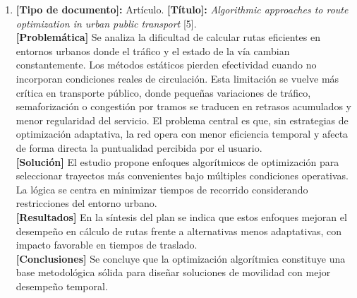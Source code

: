 \begin{enumerate}
    \item \textbf{[Tipo de documento]:} Artículo. \textbf{[Título]:} \textit{Algorithmic approaches to route optimization in urban public transport} [5].\\
    \textbf{[Problemática]} Se analiza la dificultad de calcular rutas eficientes en entornos urbanos donde el tr\'{a}fico y el estado de la v\'{i}a cambian constantemente. Los m\'{e}todos est\'{a}ticos pierden efectividad cuando no incorporan condiciones reales de circulaci\'{o}n. Esta limitaci\'{o}n se vuelve m\'{a}s cr\'{i}tica en transporte p\'{u}blico, donde pequeñas variaciones de tr\'{a}fico, semaforizaci\'{o}n o congesti\'{o}n por tramos se traducen en retrasos acumulados y menor regularidad del servicio. El problema central es que, sin estrategias de optimizaci\'{o}n adaptativa, la red opera con menor eficiencia temporal y afecta de forma directa la puntualidad percibida por el usuario.\\
    \textbf{[Solución]} El estudio propone enfoques algorítmicos de optimización para seleccionar trayectos más convenientes bajo múltiples condiciones operativas. La lógica se centra en minimizar tiempos de recorrido considerando restricciones del entorno urbano.\\
    \textbf{[Resultados]} En la síntesis del plan se indica que estos enfoques mejoran el desempeño en cálculo de rutas frente a alternativas menos adaptativas, con impacto favorable en tiempos de traslado.\\
    \textbf{[Conclusiones]} Se concluye que la optimización algorítmica constituye una base metodológica sólida para diseñar soluciones de movilidad con mejor desempeño temporal.


\end{enumerate}
